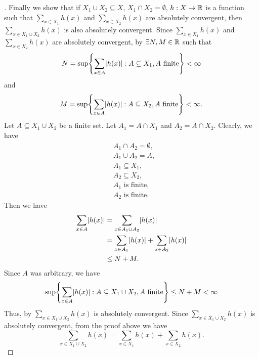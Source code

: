 \begin{proof}[]
  Finally we show that if \(X_1 \cup X_2 \subseteq X\), \(X_1 \cap X_2 = \emptyset\), \(h : X \to \mathbb{R}\) is a function such that \(\sum_{x \in X_1} h(x)\) and \(\sum_{x \in X_2} h(x)\) are absolutely convergent, then \(\sum_{x \in X_1 \cup X_2} h(x)\) is also absolutely convergent.
  Since \(\sum_{x \in X_1} h(x)\) and \(\sum_{x \in X_2} h(x)\) are absolutely convergent, by  \(\exists N, M \in \mathbb{R}\) such that
  \[
    N = \sup\set{\sum_{x \in A} \abs{h(x)} : A \subseteq X_1, A \text{ finite}} < \infty
  \]
  and
  \[
    M = \sup\set{\sum_{x \in A} \abs{h(x)} : A \subseteq X_2, A \text{ finite}} < \infty.
  \]
  Let \(A \subseteq X_1 \cup X_2\) be a finite set.
  Let \(A_1 = A \cap X_1\) and \(A_2 = A \cap X_2\).
  Clearly, we have
  \begin{align*}
     & A_1 \cap A_2 = \emptyset, \\
     & A_1 \cup A_2 = A,         \\
     & A_1 \subseteq X_1,        \\
     & A_2 \subseteq X_2,        \\
     & A_1 \text{ is finite},    \\
     & A_2 \text{ is finite}.
  \end{align*}
  Then we have
  \begin{align*}
    \sum_{x \in A} \abs{h(x)} & = \sum_{x \in A_1 \cup A_2} \abs{h(x)}                      \\
                              & = \sum_{x \in A_1} \abs{h(x)} + \sum_{x \in A_2} \abs{h(x)} \\
                              & \leq N + M.
  \end{align*}
  Since \(A\) was arbitrary, we have
  \[
    \sup\set{\sum_{x \in A} \abs{h(x)} : A \subseteq X_1 \cup X_2, A \text{ finite}} \leq N + M < \infty
  \]
  Thus, by  \(\sum_{x \in X_1 \cup X_2} h(x)\) is absolutely convergent.
  Since \(\sum_{x \in X_1 \cup X_2} h(x)\) is absolutely convergent, from the proof above we have
  \[
    \sum_{x \in X_1 \cup X_2} h(x) = \sum_{x \in X_1} h(x) + \sum_{x \in X_2} h(x).
  \]
\end{proof}

